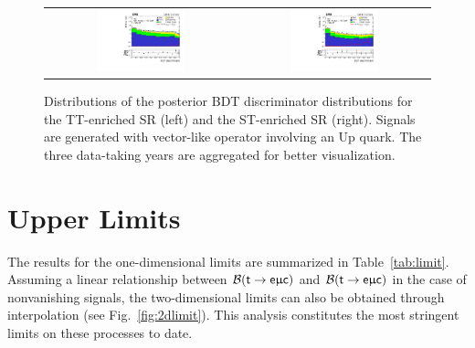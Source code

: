 \begin{figure}[tbh!]
 \begin{center}
 \begin{tabular}{cc}
  \includegraphics[width=0.48\textwidth]{figures/Part3/Results/BDT_TT_VecU}&
  \includegraphics[width=0.48\textwidth]{figures/Part3/Results/BDT_ST_VecU}\\
 \end{tabular}
 \caption{Distributions of the posterior BDT discriminator distributions for the TT-enriched SR (left) and the ST-enriched SR (right). Signals are generated with vector-like operator involving an Up quark. The three data-taking years are aggregated for better visualization.}
 \label{fig:bdt_postfit_VecU}
 \end{center}
\end{figure} 
\section{Upper Limits}
\label{sec:Limits}

The results for the one-dimensional limits are summarized in Table~\ref{tab:limit}. Assuming a linear relationship between $\mathcal{B}(\textsf{t}\rightarrow\textsf{e}\upmu\textsf{c})$ and $\mathcal{B}(\textsf{t}\rightarrow\textsf{e}\upmu\textsf{c})$ in the case of nonvanishing signals, the two-dimensional limits can also be obtained through interpolation (see Fig.~\ref{fig:2dlimit}). This analysis constitutes the most stringent limits on these processes to date.


